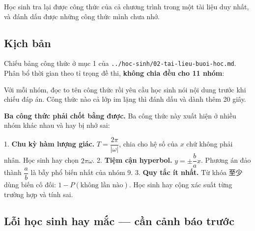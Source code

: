 \documentclass[11pt, a4paper]{article}
\begin{document}
Học sinh tra lại được công thức của cả chương trình trong một tài liệu duy nhất, và đánh dấu được những công thức mình chưa nhớ.

\subsection{Kịch bản}

Chiếu bảng công thức ở mục 1 của \texttt{../hoc-sinh/02-tai-lieu-buoi-hoc.md}. Phân bổ thời gian theo tỉ trọng đề thi, \textbf{không chia đều cho 11 nhóm}:


 Với mỗi nhóm, đọc to tên công thức rồi yêu cầu học sinh nói nội dung trước khi chiếu đáp án. Công thức nào cả lớp im lặng thì đánh dấu và dành thêm 20 giây.

\textbf{Ba công thức phải chốt bằng được.} Ba công thức này xuất hiện ở nhiều nhóm khác nhau và hay bị nhớ sai:

1. \textbf{Chu kỳ hàm lượng giác.} $T = \dfrac{2\pi}{\lvert \omega \rvert}$, chia cho hệ số của $x$ chứ không phải nhân. Học sinh hay chọn $2\pi\omega$.
2. \textbf{Tiệm cận hyperbol.} $y = \pm\dfrac{b}{a}x$. Phương án đảo thành $\dfrac{a}{b}$ là bẫy phổ biến nhất của nhóm 9.
3. \textbf{Quy tắc ít nhất.} Từ khóa 至少 dùng biến cố đối: $1 - P(\text{không lần nào})$. Học sinh hay cộng xác suất từng trường hợp và tính sai.

\subsection{Lỗi học sinh hay mắc — cần cảnh báo trước}
\end{document}
